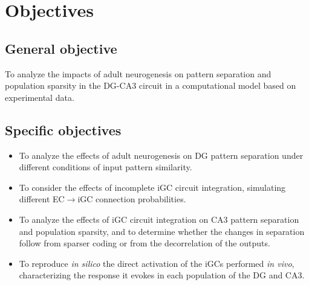 \chapter{Objectives}\label{cap:objectives}

\section{General objective}

To analyze the impacts of adult neurogenesis on pattern separation and population sparsity in the DG-CA3 circuit in a
computational model based on experimental data.

\section{Specific objectives}

\begin{itemize}
    \item To analyze the effects of adult neurogenesis on DG pattern separation under different conditions of input pattern
    similarity.
    \item To consider the effects of incomplete iGC circuit integration, simulating different EC$\to$iGC connection
    probabilities.
    \item To analyze the effects of iGC circuit integration on CA3 pattern separation and population sparsity, and to determine
    whether the changes in separation follow from sparser coding or from the decorrelation of the outputs.
    \item To reproduce \textit{in silico} the direct activation of the iGCs performed \textit{in vivo}, characterizing the
    response it evokes in each population of the DG and CA3.
\end{itemize}
